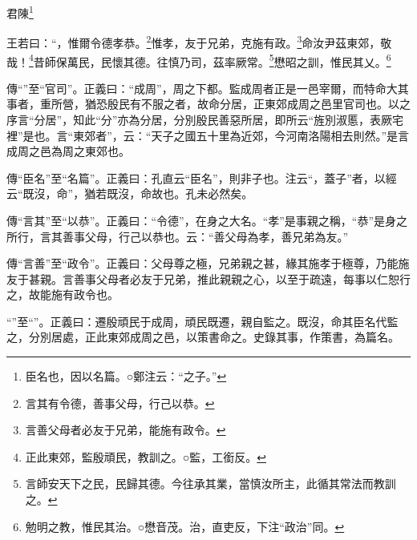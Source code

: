 君陳\footnote{臣名也，因以名篇。○鄭注云：“之子。”}

王若曰：“，惟爾令德孝恭。\footnote{言其有令德，善事父母，行己以恭。}惟孝，友于兄弟，克施有政。\footnote{言善父母者必友于兄弟，能施有政令。}命汝尹茲東郊，敬哉！\footnote{正此東郊，監殷頑民，教訓之。○監，工銜反。}昔師保萬民，民懷其德。往慎乃司，茲率厥常。\footnote{言師安天下之民，民歸其德。今往承其業，當慎汝所主，此循其常法而教訓之。}懋昭之訓，惟民其乂。\footnote{勉明之教，惟民其治。○懋音茂。治，直吏反，下注“政治”同。}


{\noindent\zhuan{}\fzbyks 傳“”至“官司”。正義曰：“成周”，周之下都。監成周者正是一邑宰爾，而特命大其事者，重所營，猶恐殷民有不服之者，故命分居，正東郊成周之邑里官司也。以之序言“分居”，知此“分”亦為分居，分別殷民善惡所居，即所云“旌別淑慝，表厥宅裡”是也。言“東郊者”，云：“天子之國五十里為近郊，今河南洛陽相去則然。”是言成周之邑為周之東郊也。 \par}

{\noindent\zhuan{}\fzbyks 傳“臣名”至“名篇”。正義曰：孔直云“臣名”，則非子也。注云“，蓋子”者，以經云“既沒，命”，猶若既沒，命故也。孔未必然矣。 \par}

{\noindent\zhuan{}\fzbyks 傳“言其”至“以恭”。正義曰：“令德”，在身之大名。“孝”是事親之稱，“恭”是身之所行，言其善事父母，行己以恭也。云：“善父母為孝，善兄弟為友。” \par}

{\noindent\zhuan{}\fzbyks 傳“言善”至“政令”。正義曰：父母尊之極，兄弟親之甚，緣其施孝于極尊，乃能施友于甚親。言善事父母者必友于兄弟，推此親親之心，以至于疏遠，每事以仁恕行之，故能施有政令也。 \par}

{\noindent\shu{}\fzkt “”至“”。正義曰：遷殷頑民于成周，頑民既遷，親自監之。既沒，命其臣名代監之，分別居處，正此東郊成周之邑，以策書命之。史錄其事，作策書，為篇名。 \par}

